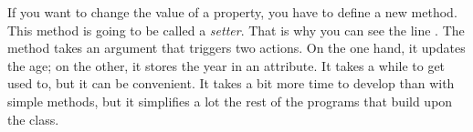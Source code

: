 If you want to change the value of a property, you have to define a new method. This method is going to be called a \textit{setter}. That is why you can see the line . The method takes an argument that triggers two actions. On the one hand, it updates the age; on the other, it stores the year in an attribute. It takes a while to get used to, but it can be convenient. It takes a bit more time to develop than with simple methods, but it simplifies a lot the rest of the programs that build upon the class.
